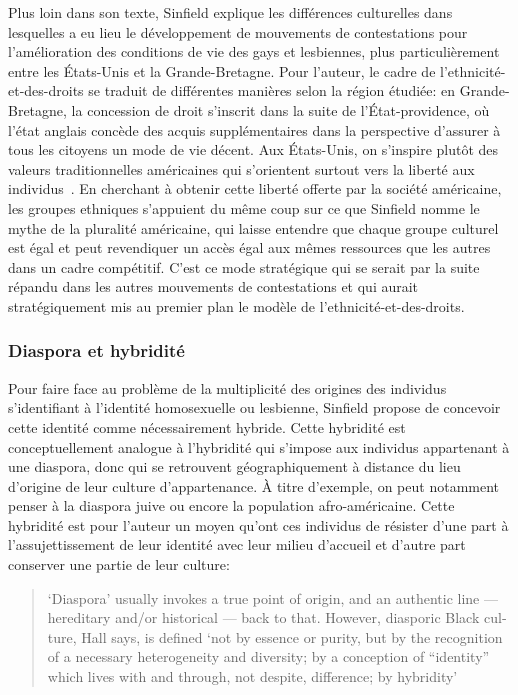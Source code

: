 Plus loin dans son texte, Sinfield explique les différences culturelles dans lesquelles a eu lieu le développement de mouvements de contestations pour l'amélioration des conditions de vie des gays et lesbiennes, plus particulièrement entre les États-Unis et la Grande-Bretagne. 
Pour l'auteur, le cadre de l'ethnicité-et-des-droits se traduit de différentes manières selon la région étudiée: en Grande-Bretagne, la concession de droit s'inscrit dans la suite de l'État-providence, où l'état anglais concède des acquis supplémentaires dans la perspective d'assurer à tous les citoyens un mode de vie décent. 
Aux États-Unis, on s'inspire plutôt des valeurs traditionnelles américaines qui s'orientent surtout vers la liberté aux individus~\citep[274]{Sinfield1996}. 
En cherchant à obtenir cette liberté offerte par la société américaine, les groupes ethniques s'appuient du même coup sur ce que Sinfield nomme le mythe de la pluralité américaine, qui laisse entendre que chaque groupe culturel est égal et peut revendiquer un accès égal aux mêmes ressources que les autres dans un cadre compétitif. 
C'est ce mode stratégique qui se serait par la suite répandu dans les autres mouvements de contestations et qui aurait stratégiquement mis au premier plan le modèle de l'ethnicité-et-des-droits.

\subsubsection{Diaspora et hybridité}
\label{sub:diaspora_et_hybridit_} Pour faire face au problème de la multiplicité des origines des individus s'identifiant à l'identité homosexuelle ou lesbienne, Sinfield propose de concevoir cette identité comme nécessairement hybride. 
Cette hybridité est conceptuellement analogue à l'hybridité qui s'impose aux individus appartenant à une diaspora, donc qui se retrouvent géographiquement à distance du lieu d'origine de leur culture d'appartenance. 
À titre d'exemple, on peut notamment penser à la diaspora juive ou encore la population afro-américaine.
Cette hybridité est pour l'auteur un moyen qu'ont ces individus de résister d'une part à l'assujettissement de leur identité avec leur milieu d'accueil et d'autre part conserver une partie de leur culture: \foreignblockquote{english}[{\cite[278]{Sinfield1996}}][.]{`Diaspora' \textelp{}   usually invokes a true point of origin, and an authentic line --- hereditary   and/or historical --- back to that. However, diasporic Black culture, Hall says, is defined `not by essence or purity, but by the recognition of a necessary heterogeneity and diversity; by a conception of ``identity'' which lives with and through, not despite, difference; by hybridity'}

